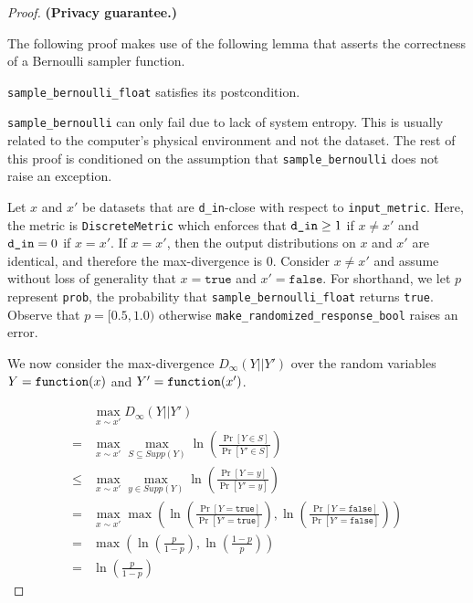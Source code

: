 \documentclass{article}
\begin{document}
\begin{proof} 
\textbf{(Privacy guarantee.)} 

\begin{tcolorbox}
\begin{note}
    The following proof makes use of the following lemma that asserts the correctness of a Bernoulli sampler function.
    \begin{lemma}
        \texttt{sample\_bernoulli\_float} satisfies its postcondition.
    \end{lemma}
\end{note}
\end{tcolorbox}

\texttt{sample\_bernoulli} can only fail due to lack of system entropy. 
This is usually related to the computer's physical environment and not the dataset. 
The rest of this proof is conditioned on the assumption that \texttt{sample\_bernoulli} does not raise an exception. 

Let $x$ and $x'$ be datasets that are \texttt{d\_in}-close with respect to \texttt{input\_metric}.
Here, the metric is \texttt{DiscreteMetric} which enforces that $\texttt{d\_in} \geq 1$ if $x \ne x'$ and $\texttt{d\_in} = 0$ if $x = x'$. 
If $x = x'$, then the output distributions on $x$ and $x'$ are identical, and therefore the max-divergence is 0.
Consider $x \ne x'$ and assume without loss of generality that $x = \texttt{true}$ and $x' = \texttt{false}$. 
For shorthand, we let $p$ represent \texttt{prob}, the probability that \texttt{sample\_bernoulli\_float} returns \texttt{true}. 
Observe that $p = [0.5, 1.0)$ otherwise \texttt{make\_randomized\_response\_bool} raises an error. 

We now consider the max-divergence $D_{\infty}(Y||Y')$ over the random variables $Y = \texttt{function}(x)$ and $Y' = \texttt{function}(x')$.

\begin{align*}
    &\max_{x \sim x'} D_{\infty}(Y||Y') \\
    =& \max_{x \sim x'} \max_{S \subseteq Supp(Y)}\ln (\frac{\Pr[Y \in S]}{\Pr[Y' \in S]}) \\
    \le& \max_{x \sim x'} \max_{y \in Supp(Y)}\ln (\frac{\Pr[Y = y]}{\Pr[Y' = y]}) \\
    =& \max_{x \sim x'} \max\left(\ln (\frac{\Pr[Y = \texttt{true}]}{\Pr[Y' = \texttt{true}]}), \ln(\frac{\Pr[Y = \texttt{false}]}{\Pr[Y' = \texttt{false}]})\right) \\
    =& \max\left(\ln (\frac{p}{1 - p}), \ln(\frac{1 - p}{p})\right) \\
    =& \ln (\frac{p}{1 - p})
\end{align*}


\end{proof}
\end{document}
